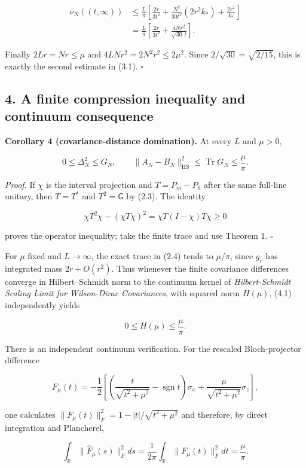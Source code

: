 \documentclass[
  10pt,
  a4paper,
]{article}
\begin{document}
\[
 \begin{aligned}
 \nu_N((t,\infty))
 &\le\frac L\pi\left[
 \frac{2r}{3t^2}+
 \frac{N^2}{30t^2}(2r^2 k_*)+
 \frac{2r^2}{k_*}\right]\\
 &=\frac L\pi\left[\frac{2r}{3t^2}+
 \frac{4Nr^2}{\sqrt{30}\,t}\right].
 \end{aligned}
\]

Finally \(2Lr=Nr\le\mu\) and \(4LNr^2=2N^2r^2\le2\mu^2\). Since \(2/\sqrt{30}=\sqrt{2/15}\), this is exactly the second estimate in (3.1). \(\square\)

\subsection{4. A finite compression inequality and continuum consequence}\label{a-finite-compression-inequality-and-continuum-consequence}

\textbf{Corollary 4 (covariance-distance domination).} At every \(L\) and \(\mu>0\),

\[
 \boxed{0\le\Delta_N^2\le G_N,\qquad
 \|A_N-B_N\|_{\mathrm{HS}}^2\le\operatorname{Tr}G_N\le\frac\mu\pi.}
 \tag{4.1}
\]

\emph{Proof.} If \(\chi\) is the interval projection and \(T=P_m-P_0\) after the same full-line unitary, then \(T=T^*\) and \(T^2=\mathsf G\) by (2.3). The identity

\[
 \chi T^2\chi-(\chi T\chi)^2
 =\chi T(I-\chi)T\chi\ge0
\]

proves the operator inequality; take the finite trace and use Theorem 1. \(\square\)

For \(\mu\) fixed and \(L\to\infty\), the exact trace in (2.4) tends to \(\mu/\pi\), since \(g_r\) has integrated mass \(2r+O(r^2)\). Thus whenever the finite covariance differences converge in Hilbert--Schmidt norm to the continuum kernel of \emph{Hilbert-Schmidt Scaling Limit for Wilson-Dirac Covariances}, with squared norm \(H(\mu)\), (4.1) independently yields

\[
 0\le H(\mu)\le\frac\mu\pi.
\]

There is an independent continuum verification. For the rescaled Bloch-projector difference

\[
F_\mu(t)=-\frac12\left[\left(\frac{t}{\sqrt{t^2+\mu^2}}-\operatorname{sgn}t\right)\sigma_x+
\frac{\mu}{\sqrt{t^2+\mu^2}}\sigma_z\right],
\]

one calculates \(\|F_\mu(t)\|_F^2=1-|t|/\sqrt{t^2+\mu^2}\) and therefore, by direct integration and Plancherel,

\[
\int_{\mathbb R}\|\widehat F_\mu(s)\|_F^2ds
=\frac1{2\pi}\int_{\mathbb R}\|F_\mu(t)\|_F^2dt
=\frac\mu\pi.
\]
\end{document}
